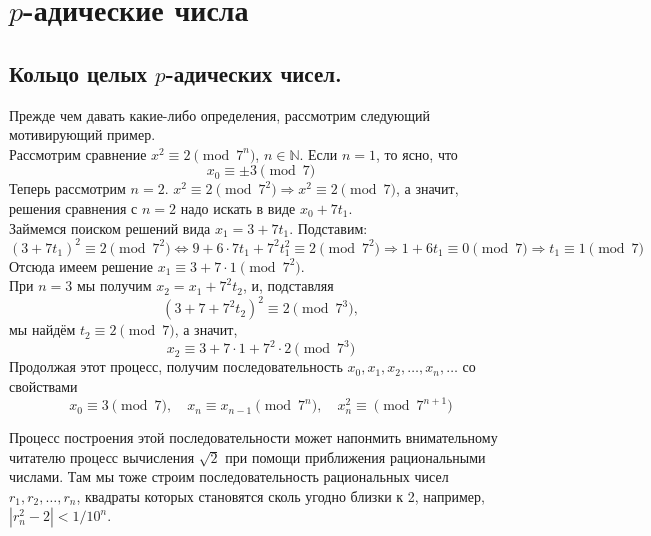 \documentclass[11pt]{report}
\begin{document}
   \section{$p$-адические числа}
   \subsection{Кольцо целых $p$-адических чисел.}

    Прежде чем давать какие-либо определения, рассмотрим следующий мотивирующий пример. \\
    Рассмотрим сравнение $x^2 \equiv 2 \pmod{7^n}$, $n \in \mathbb{N}$. Если $n = 1$, то ясно, что
    \[ x_0 \equiv \pm 3 \pmod{7} \]
    Теперь рассмотрим $n = 2$. $x^2 \equiv 2 \pmod{7^2} \Rightarrow x^2 \equiv 2
    \pmod{7}$, а значит, решения сравнения с $n = 2$ надо искать в виде $x_0 + 7t_1$.\\
    Займемся поиском решений вида $x_1 = 3 + 7t_1$. Подставим:
    \[ (3 + 7t_1)^2 \equiv 2 \pmod{7^2} \Leftrightarrow 9 + 6 \cdot 7t_1 + 7^2 t_1^2 \equiv 2 \pmod{7^2} \Rightarrow 1 + 6t_1 \equiv 0 \pmod{7} \Rightarrow t_1 \equiv 1 \pmod 7 \]
    Отсюда имеем решение  $x_1 \equiv 3 + 7 \cdot 1 \pmod{7^2}$.\\
    При $n = 3$ мы получим $x_2 = x_1 + 7^2 t_2$, и, подставляя
    \[ (3 + 7 + 7^2 t_2)^2 \equiv 2 \pmod{7^3}, \]
    мы найдём $t_2 \equiv 2 \pmod{7}$, а значит,
    \[ x_2 \equiv 3 + 7 \cdot 1 + 7^2 \cdot 2 \pmod{7^3} \]
    Продолжая этот процесс, получим последовательность $x_0, x_1, x_2, \ldots, x_n, \ldots$ со свойствами
    \[ x_0 \equiv 3 \pmod{7}, \quad x_n \equiv x_{n - 1} \pmod{7^n}, \quad x_n^2 \equiv \pmod{7^{n + 1}} \]

    Процесс построения этой последовательности может напонмить внимательному читателю процесс вычисления $\sqrt{2}$
    при помощи приближения рациональными числами. Там мы тоже строим последовательность рациональных чисел
    $r_1, r_2, \ldots, r_n$, квадраты которых становятся сколь угодно близки к 2, например, $|r_n^2 - 2|< 1/10^n$.
\end{document}

